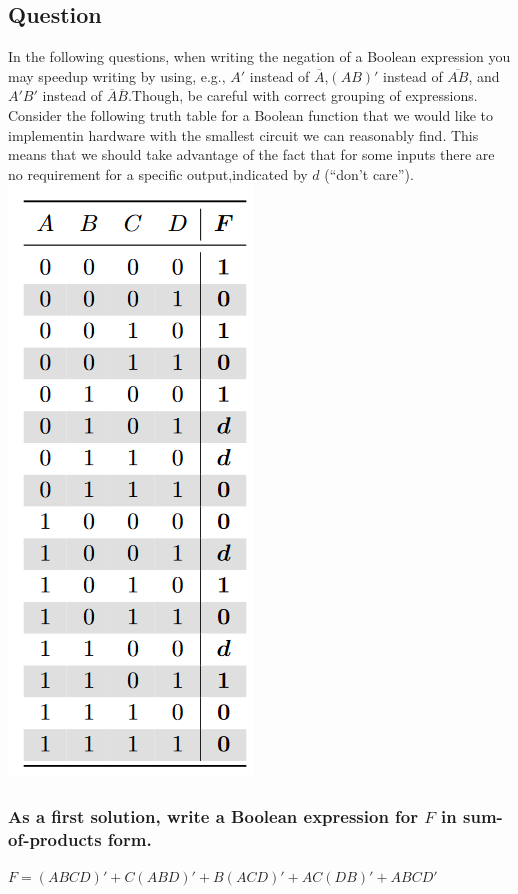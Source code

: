 \documentclass[12pt, a4paper]{article}
\begin{document}
		\subsection{Question}
			In the following questions, when writing the negation of a Boolean expression you may speedup writing by using, e.g., $A'$ instead of $\overline{A}$,$(AB)'$ instead of $\overline{AB}$, and $A'B'$ instead of $\overline{A}\overline{B}$.Though, be careful with correct grouping of expressions.\\[4mm]
			Consider the following truth table for a Boolean function that we would like to implementin hardware with the smallest circuit we can reasonably find. This means that we should take advantage of the fact that for some inputs there are no requirement for a specific output,indicated by $d$ (“don’t care”).\\
			\includegraphics{assets/183.png}
			\subsubsection{As a first solution, write a Boolean expression for $F$ in sum-of-products form.}
				$F=(ABCD)'+C(ABD)'+B(ACD)'+AC(DB)'+ABCD'$
\end{document}
